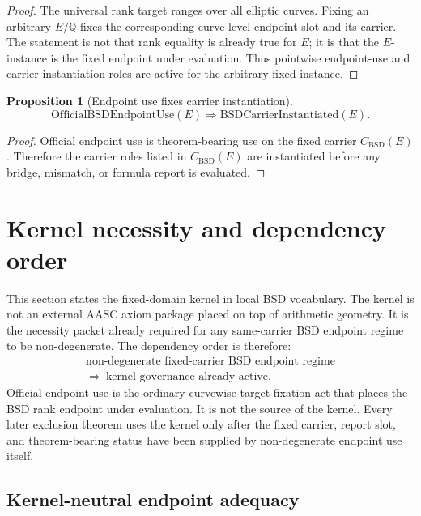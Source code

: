 \documentclass[11pt]{article}
\newtheorem{proposition}[theorem]{Proposition}
\newcommand{\Q}{\mathbb{Q}}
\newcommand{\BSD}{\mathrm{BSD}}
\begin{document}
\begin{proof}
The universal rank target ranges over all elliptic curves. Fixing an arbitrary $E/\Q$ fixes the corresponding curve-level endpoint slot and its carrier. The statement is not that rank equality is already true for $E$; it is that the $E$-instance is the fixed endpoint under evaluation. Thus pointwise endpoint-use and carrier-instantiation roles are active for the arbitrary fixed instance.
\end{proof}

\begin{proposition}[Endpoint use fixes carrier instantiation]\label{prop:endpoint-fixes-carrier}
\[
\mathrm{OfficialBSDEndpointUse}(E)\Rightarrow \mathrm{BSDCarrierInstantiated}(E).
\]
\end{proposition}

\begin{proof}
Official endpoint use is theorem-bearing use on the fixed carrier $C_{\BSD}(E)$. Therefore the carrier roles listed in $C_{\BSD}(E)$ are instantiated before any bridge, mismatch, or formula report is evaluated.
\end{proof}


\section{Kernel necessity and dependency order}

This section states the fixed-domain kernel in local BSD vocabulary. The kernel is not an external AASC axiom package placed on top of arithmetic geometry. It is the necessity packet already required for any same-carrier BSD endpoint regime to be non-degenerate. The dependency order is therefore:
\[
\begin{gathered}
\text{non-degenerate fixed-carrier BSD endpoint regime}\\
\Rightarrow\ \text{kernel governance already active}.
\end{gathered}
\]
Official endpoint use is the ordinary curvewise target-fixation act that places the BSD rank endpoint under evaluation. It is not the source of the kernel. Every later exclusion theorem uses the kernel only after the fixed carrier, report slot, and theorem-bearing status have been supplied by non-degenerate endpoint use itself.

\subsection{Kernel-neutral endpoint adequacy}
\end{document}
